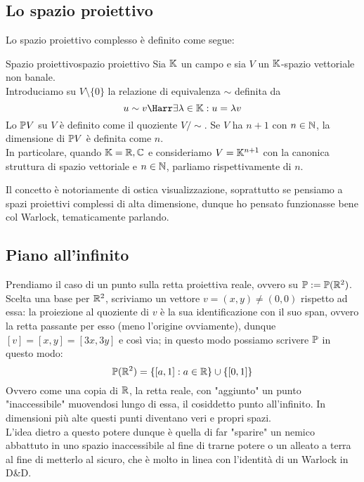 \documentclass{article}
\begin{document}
\subsection{Lo spazio proiettivo}

Lo spazio proiettivo complesso è definito come segue:

\begin{definition}{Spazio proiettivo}{spazio proiettivo}
    Sia $\K$ un campo e sia $V$ un $\K$-spazio vettoriale non banale.\\
    Introduciamo su $V\setminus \{0\}$ la relazione di equivalenza $\sim$ definita da 
    \[u\sim v \Harr \exists \lambda \in \K : u = \lambda v\]
    Lo  $\P V$ su $V$ è definito come il quoziente $V/\sim$. Se $V$ ha  $n+1$ con $n \in \N$, la dimensione di $\P V$ è definita come $n$.\\
    In particolare, quando $\K = \R, \C$ e consideriamo $V = \K^{n+1}$ con la canonica struttura di spazio vettoriale e $n\in \N$, parliamo rispettivamente di  $n$.
\end{definition}

Il concetto è notoriamente di ostica visualizzazione, soprattutto se pensiamo a spazi proiettivi complessi di alta dimensione, dunque ho pensato funzionasse bene col Warlock, tematicamente parlando.

\subsection{Piano all'infinito}

Prendiamo il caso di un punto sulla retta proiettiva reale, ovvero su $\P := \P(\R^2)$.\\
Scelta una base per $\R^2$, scriviamo un vettore $v = (x,y)\neq(0,0)$ rispetto ad essa: la proiezione al quoziente di $v$ è la sua identificazione con il suo span, ovvero la retta passante per esso (meno l'origine ovviamente), dunque $[v] = [x,y] = [3x,3y]$ e così via; in questo modo possiamo scrivere $\P$ in questo modo:
\[ \P(\R^2) = \{ [a,1] : a \in \R \}\cup \{ [0,1] \}\]
Ovvero come una copia di $\R$, la retta reale, con "aggiunto" un punto "inaccessibile" muovendosi lungo di essa, il cosiddetto punto all'infinito. In dimensioni più alte questi punti diventano veri e propri spazi.\\
L'idea dietro a questo potere dunque è quella di far "sparire" un nemico abbattuto in uno spazio inaccessibile al fine di trarne potere o un alleato a terra al fine di metterlo al sicuro, che è molto in linea con l'identità di un Warlock in D\&D.
\end{document}

